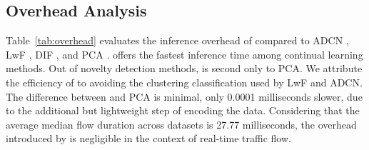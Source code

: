 \subsection{Overhead Analysis}
\begin{table}[]
\centering

\caption{Average inference time (in ms) per test sample}
\label{tab:overhead}
\end{table}
Table~\ref{tab:overhead} evaluates the inference overhead of \Design{} compared to ADCN \cite{ashfahani2023unsupervised}, LwF \cite{lwf2019Li}, DIF \cite{xu2023deep}, and PCA \cite{rios2022incdfm}. %
\Design{} offers the fastest inference time among continual learning methods. Out of novelty detection methods, \Design{} is second only to PCA. We attribute the efficiency of \Design{} to avoiding the clustering classification used by LwF and ADCN. %
The difference between \Design{} and PCA is minimal, only 0.0001 milliseconds slower, due to the additional but lightweight step of encoding the data. Considering that the average median flow duration across datasets is 27.77 milliseconds, the overhead introduced by \Design{} is negligible in the context of real-time traffic flow.

